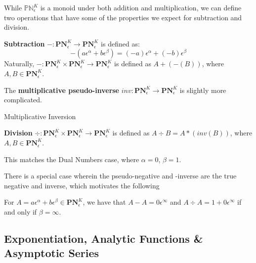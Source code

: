 \documentclass[acmsmall]{acmart}
\begin{document}
While $\mathbb{PN}^K_\epsilon$ is a monoid under both addition and multiplication, we can define two operations that have some of the properties we expect for subtraction and division. \\

\begin{definition} 
\textbf{Subtraction} $-:\mathbf{PN}^K_\epsilon \rightarrow \mathbf{PN}^K_\epsilon$ is defined as:
$$-(a\epsilon^\alpha + b\epsilon^\beta) = (-a)\epsilon^\alpha + (-b)\epsilon^\beta$$
Naturally, $-:\mathbf{PN}^K_\epsilon \times \mathbf{PN}^K_\epsilon \rightarrow \mathbf{PN}^K_\epsilon$ is defined as $A + (-(B))$, where $A, B \in \mathbf{PN}^K_\epsilon$.
\end{definition}

\begin{definition}
The \textbf{multiplicative pseudo-inverse} $inv:\mathbf{PN}^K_\epsilon \rightarrow \mathbf{PN}^K_\epsilon$ is slightly more complicated.

\begin{algorithm}[H]
	\SetAlgoLined
	
	\caption{Multiplicative Inversion}	
\end{algorithm}

\textbf{Division} $\div:\mathbf{PN}^K_\epsilon \times \mathbf{PN}^K_\epsilon \rightarrow \mathbf{PN}^K_\epsilon$ is defined as $A \div B = A * (inv(B))$, where $A, B \in \mathbf{PN}^K_\epsilon$.
\end{definition}

This matches the Dual Numbers case, where $\alpha = 0$, $\beta = 1$.

There is a special case wherein the pseudo-negative and -inverse are the true negative and inverse, which motivates the following
\begin{proposition}
For $A = a\epsilon^\alpha + b\epsilon^\beta \in \mathbf{PN}^K_\epsilon$, we have that $A-A=0\epsilon^\infty$ and $A \div A = 1 + 0\epsilon^\infty$ if and only if $\beta = \infty$.
\end{proposition}

\subsection{Exponentiation, Analytic Functions \& Asymptotic Series}
\end{document}
